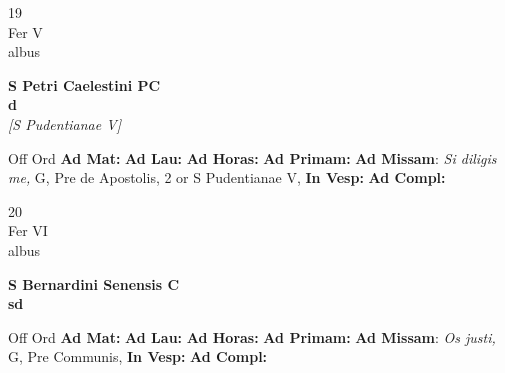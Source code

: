 \documentclass[10pt, openany]{book}
\begin{document}
        \begin{center}
            \begin{minipage}{3.5in}
                \vspace{2em}
                \begin{minipage}{0.5in}
                    {\Huge 19} \\
                    {\normalsize Fer V} \\
                    {\normalsize albus}
                \end{minipage}
                \begin{minipage}{3.0in}
                    \textbf{ \large S Petri Caelestini PC \\
                    \textnormal{\normalsize d}} \\ \textit{[S Pudentianae V]} \\ 
                \end{minipage}
                \begin{justify}Off Ord
                    \textbf{Ad Mat: }
                    \textbf{Ad Lau: }
                    \textbf{Ad Horas: }
                    \textbf{Ad Primam: }\textbf{Ad Missam}: \textit{Si diligis me,} G, Pre de Apostolis, 2 or S Pudentianae V,  
                    \textbf{In Vesp: }
                    \textbf{Ad Compl: }
                \end{justify}
            \end{minipage}
        \end{center}
    
        \begin{center}
            \begin{minipage}{3.5in}
                \vspace{2em}
                \begin{minipage}{0.5in}
                    {\Huge 20} \\
                    {\normalsize Fer VI} \\
                    {\normalsize albus}
                \end{minipage}
                \begin{minipage}{3.0in}
                    \textbf{ \large S Bernardini Senensis C \\
                    \textnormal{\normalsize sd}} \\ 
                \end{minipage}
                \begin{justify}Off Ord
                    \textbf{Ad Mat: }
                    \textbf{Ad Lau: }
                    \textbf{Ad Horas: }
                    \textbf{Ad Primam: }\textbf{Ad Missam}: \textit{Os justi,} G, Pre Communis,  
                    \textbf{In Vesp: }
                    \textbf{Ad Compl: }
                \end{justify}
            \end{minipage}
        \end{center}
    
\end{document}
